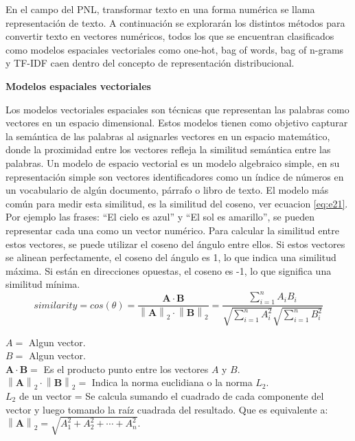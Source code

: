 En el campo del PNL, transformar texto en una forma numérica se llama representación de texto. A continuación se explorarán los distintos métodos para convertir texto en vectores numéricos, todos los que se encuentran clasificados como modelos espaciales vectoriales como one-hot, bag of words, bag of n-grams y TF-IDF  caen dentro del concepto de representación distribucional.


\textbf{Modelos espaciales vectoriales}

Los modelos vectoriales espaciales son técnicas que representan las palabras como vectores en un espacio dimensional. Estos modelos tienen como objetivo capturar la semántica de las palabras al asignarles vectores en un espacio matemático, donde la proximidad entre los vectores refleja la similitud semántica entre las palabras. Un modelo de espacio vectorial  es un modelo algebraico simple, en su representación simple son vectores identificadores como un índice de números en un vocabulario de algún documento, párrafo o libro de texto. El modelo más común para medir esta similitud, es la similitud del coseno, ver ecuacion \ref{eq:e21}. Por ejemplo las frases: ``El cielo es azul'' y ``El sol es amarillo'', se pueden representar cada una como un vector numérico. Para calcular la similitud entre estos vectores, se puede utilizar  el coseno del ángulo entre ellos. Si estos vectores se alinean perfectamente, el coseno del ángulo es 1, lo que indica una similitud máxima. Si están en direcciones opuestas, el coseno es -1, lo que significa una similitud mínima.
\begin{equation} \label{eq:e21} 
	similarity = cos(\theta) = \frac{\mathbf{A} \cdot \mathbf{B}}{\left \|  \mathbf{A} \right \|_2\cdot \left \|  \mathbf{B} \right \|_2}=\frac{\displaystyle\sum_{i=1}^{n}A_iB_i}{\sqrt{\displaystyle\sum_{i=1}^{n}A_i^2}\sqrt{\displaystyle\sum_{i=1}^{n}B_i^2}}
\end{equation}


$A = $  Algun vector.\\
$B = $  Algun vector.\\
$\mathbf{A} \cdot \mathbf{B} =$ Es el producto punto entre los vectores $A$ y $B$.\\
$\left \|  \mathbf{A} \right \|_2\cdot \left \|  \mathbf{B} \right \|_2 = $ Indica la norma euclidiana o la norma $L_2$. \\
$L_2$  de un vector = Se calcula sumando el cuadrado de cada componente del vector y luego tomando la raíz cuadrada del resultado. Que es equivalente a: 
$\left \|  \mathbf{A} \right \|_2 = \sqrt{A_1^2 + A_2^2 + \cdots + A_n^2} $.\\


